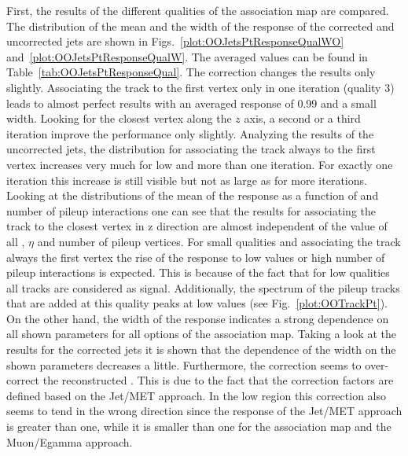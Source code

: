 First, the results of the different qualities of the association map are compared. The distribution of the mean and the width of the \pt{} response of the corrected and uncorrected jets are shown in Figs.~\ref{plot:OOJetsPtResponseQualWO} and~\ref{plot:OOJetsPtResponseQualW}. The averaged values can be found in Table~\ref{tab:OOJetsPtResponseQual}. The correction changes the results only slightly. Associating the track to the first vertex only in one iteration (quality 3) leads to almost perfect results with an averaged \pt{} response of 0.99 and a small width. Looking for the closest vertex along the $z$ axis, a second or a third iteration improve the performance only slightly. Analyzing the results of the uncorrected jets, the distribution for associating the track always to the first vertex increases very much for low \pt and more than one iteration. For exactly one iteration this increase is still visible but not as large as for more iterations. Looking at the distributions of the mean of the \pt{} response as a function of \pt and number of pileup interactions one can see that the results for associating the track to the closest vertex in z direction are almost independent of the value of all \pt{}, $\eta$ and number of pileup vertices. For small qualities and associating the track always the first vertex the rise of the \pt{} response to low \pt{} values or high number of pileup interactions is expected. This is because of the fact that for low qualities all tracks are considered as signal. Additionally, the \pt{} spectrum of the pileup tracks that are added at this quality peaks at low values (see Fig.~\ref{plot:OOTrackPt}). On the other hand, the width of the \pt{} response indicates a strong dependence on all shown parameters for all options of the association map. Taking a look at the results for the corrected jets it is shown that the dependence of the width on the shown parameters decreases a little. Furthermore, the correction seems to over-correct the reconstructed \pt. This is due to the fact that the correction factors are defined based on the Jet/MET approach. In the low \pt region this correction also seems to tend in the wrong direction since the \pt{} response of the Jet/MET approach is greater than one, while it is smaller than one for the association map and the Muon/Egamma approach.

